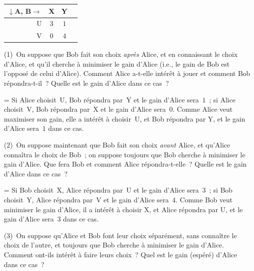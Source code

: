 \documentclass[12pt,a4paper]{article}
\theoremstyle{definition}
\newif\ifcorrige
\newenvironment{corrige}%
{\ifcorrige\relax\else\setbox0=\vbox\bgroup\fi%
\smallbreak\noindent{\underbar{\textit{Corrigé.}}\quad}}
{{\hbox{}\nobreak\hfill\checkmark}%
\ifcorrige\relax\else\egroup\fi\par}
\begin{document}
\begin{center}
\begin{tabular}{r|ccc}
$\downarrow$A, B$\rightarrow$&X&Y\\\hline
U&$3$&$1$\\
V&$0$&$4$\\
\end{tabular}
\end{center}

\smallbreak

(1) On suppose que Bob fait son choix \emph{après} Alice, et en
connaissant le choix d'Alice, et qu'il cherche à minimiser le gain
d'Alice (i.e., le gain de Bob est l'opposé de celui d'Alice).  Comment
Alice a-t-elle intérêt à jouer et comment Bob répondra-t-il ?  Quelle
est le gain d'Alice dans ce cas ?

\begin{corrige}
Si Alice choisit U, Bob répondra par Y et le gain d'Alice sera $1$ ;
si Alice choisit V, Bob répondra par X et le gain d'Alice sera $0$.
Comme Alice veut maximiser son gain, elle a intérêt à choisir U, et
Bob répondra par Y, et le gain d'Alice sera $1$ dans ce cas.
\end{corrige}

\smallbreak

(2) On suppose maintenant que Bob fait son choix \emph{avant} Alice,
et qu'Alice connaîtra le choix de Bob ; on suppose toujours que Bob
cherche à minimiser le gain d'Alice.  Que fera Bob et comment Alice
répondra-t-elle ?  Quelle est le gain d'Alice dans ce cas ?

\begin{corrige}
Si Bob choisit X, Alice répondra par U et le gain d'Alice sera $3$ ;
si Bob choisit Y, Alice répondra par V et le gain d'Alice sera $4$.
Comme Bob veut minimiser le gain d'Alice, il a intérêt à choisir X, et
Alice répondra par U, et le gain d'Alice sera $3$ dans ce cas.
\end{corrige}

\smallbreak

(3) On suppose qu'Alice et Bob font leur choix séparément, sans
connaître le choix de l'autre, et toujours que Bob cherche à minimiser
le gain d'Alice.  Comment ont-ils intérêt à faire leurs choix ?  Quel
est le gain (espéré) d'Alice dans ce cas ?
\end{document}
